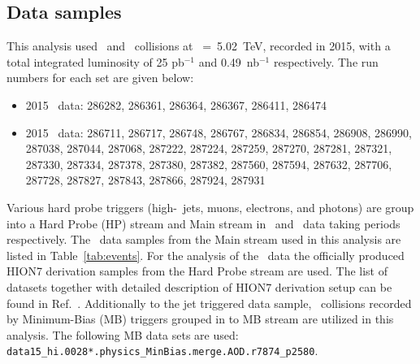 
\subsection{Data samples}

This analysis used \pp\ and \PbPb\ collisions at \sqrtsnn~=~5.02~TeV, recorded in 2015, with a total integrated luminosity of 25 pb$^{-1}$ and 0.49~nb$^{-1}$ respectively. The run numbers for each set are given below:
\begin{itemize}
\item 2015 \pp\ data: 286282, 286361, 286364, 286367, 286411, 286474
\item 2015 \PbPb\ data: 286711, 286717, 286748, 286767, 286834, 286854, 286908, 286990, 287038, 287044, 287068, 287222, 287224, 287259, 287270, 287281, 287321, 287330, 287334, 287378, 287380, 287382, 287560, 287594, 287632, 287706, 287728, 287827, 287843, 287866, 287924, 287931
\end{itemize}


Various hard probe triggers (high-\pT\ jets, muons, electrons, and photons) are group into a Hard Probe (HP) stream and Main stream in \PbPb\ and \pp\ data taking periods respectively. The \pp\ data samples from the Main stream used in this analysis are listed in Table~\ref{tab:events}. For the analysis of the \pbpb\ data the officially produced HION7 derivation samples from the Hard Probe stream are used. The list of datasets together with detailed description of HION7 derivation setup can be found in Ref.~\cite{HIdataderviation}. Additionally to the jet triggered data sample, \PbPb\ collisions recorded by Minimum-Bias (MB) triggers grouped in to MB stream are utilized in this analysis. The following MB data sets are used: \texttt{data15\_hi.0028*.physics\_MinBias.merge.AOD.r7874\_p2580}.




